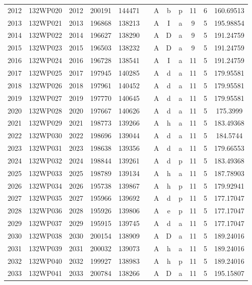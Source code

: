 \begin{tabular}{|*{12}{c|}}
2012 & 132WP020 & 2012 & 200191 & 144471 &  & A & b & p & 11 & 6 & 160.69513 \\ 
2013 & 132WP021 & 2013 & 196868 & 138213 &  & A & I & a & 9 & 5 & 195.98854 \\ 
2014 & 132WP022 & 2014 & 196627 & 138290 &  & A & D & a & 9 & 5 & 191.24759 \\ 
2015 & 132WP023 & 2015 & 196503 & 138232 &  & A & D & a & 9 & 5 & 191.24759 \\ 
2016 & 132WP024 & 2016 & 196728 & 138541 &  & A & I & a & 11 & 5 & 191.24759 \\ 
2017 & 132WP025 & 2017 & 197945 & 140285 &  & A & d & a & 11 & 5 & 179.95581 \\ 
2018 & 132WP026 & 2018 & 197961 & 140452 &  & A & d & a & 11 & 5 & 179.95581 \\ 
2019 & 132WP027 & 2019 & 197770 & 140645 &  & A & d & a & 11 & 5 & 179.95581 \\ 
2020 & 132WP028 & 2020 & 197667 & 140626 &  & A & d & a & 11 & 5 & 175.3999 \\ 
2021 & 132WP029 & 2021 & 198773 & 139266 &  & A & h & a & 11 & 5 & 183.49368 \\ 
2022 & 132WP030 & 2022 & 198696 & 139044 &  & A & d & a & 11 & 5 & 184.5744 \\ 
2023 & 132WP031 & 2023 & 198638 & 139356 &  & A & d & a & 11 & 5 & 179.66553 \\ 
2024 & 132WP032 & 2024 & 198844 & 139261 &  & A & d & p & 11 & 5 & 183.49368 \\ 
2025 & 132WP033 & 2025 & 198789 & 139134 &  & A & h & a & 11 & 5 & 187.78903 \\ 
2026 & 132WP034 & 2026 & 195738 & 139867 &  & A & h & p & 11 & 5 & 179.92941 \\ 
2027 & 132WP035 & 2027 & 195966 & 139692 &  & A & d & p & 11 & 5 & 177.17047 \\ 
2028 & 132WP036 & 2028 & 195926 & 139806 &  & A & e & p & 11 & 5 & 177.17047 \\ 
2029 & 132WP037 & 2029 & 195915 & 139745 &  & A & d & a & 11 & 5 & 177.17047 \\ 
2030 & 132WP038 & 2030 & 200154 & 138909 &  & A & D & a & 11 & 5 & 189.24016 \\ 
2031 & 132WP039 & 2031 & 200032 & 139073 &  & A & h & a & 11 & 5 & 189.24016 \\ 
2032 & 132WP040 & 2032 & 199927 & 138983 &  & A & h & p & 11 & 5 & 189.24016 \\ 
2033 & 132WP041 & 2033 & 200784 & 138266 &  & A & D & a & 11 & 5 & 195.15807 \\ 

\end{tabular}
